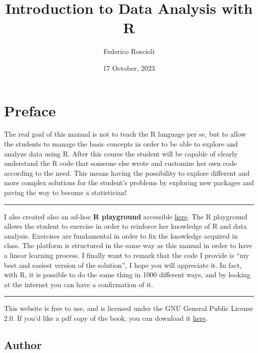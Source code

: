 \documentclass[
]{svmono}
\title{Introduction to Data Analysis with R}
\author{Federico Roscioli}
\date{17 October, 2023}
\begin{document}
\maketitle

{
\hypersetup{linkcolor=}
\setcounter{tocdepth}{2}
\tableofcontents
}
\hypertarget{preface}{%
\chapter*{Preface}\label{preface}}

The real goal of this manual is not to teach the R language per se, but
to allow the students to manage the basic concepts in order to be able
to explore and analyze data using R. After this course the student will
be capable of clearly understand the R code that someone else wrote and
customize her own code according to the need. This means having the
possibility to explore different and more complex solutions for the
student's problems by exploring new packages and paving the way to
become a statistician!

\begin{center}\rule{0.5\linewidth}{0.5pt}\end{center}

I also created also an ad-hoc \textbf{R playground} accessible
\href{https://federicoroscioli.shinyapps.io/exercises/}{here}. The R
playground allows the student to exercise in order to reinforce her
knowledge of R and data analysis. Exercises are fundamental in order to
fix the knowledge acquired in class. The platform is structured in the
same way as this manual in order to have a linear learning process. I
finally want to remark that the code I provide is ``my best and easiest
version of the solution'', I hope you will appreciate it. In fact, with
R, it is possible to do the same thing in 1000 different ways, and by
looking at the internet you can have a confirmation of it.

\begin{center}\rule{0.5\linewidth}{0.5pt}\end{center}

This website is free to use, and is licensed under the GNU General Public
License 2.0. If you'd like a pdf copy of the book, you can download it \href{https://github.com/federicoroscioli/book/blob/2b55c0f10dac709bf83a6edc26c7175128c34cd3/docs/_main.pdf}{here}.

\hypertarget{author}{%
\section*{Author}\label{author}}
\end{document}
